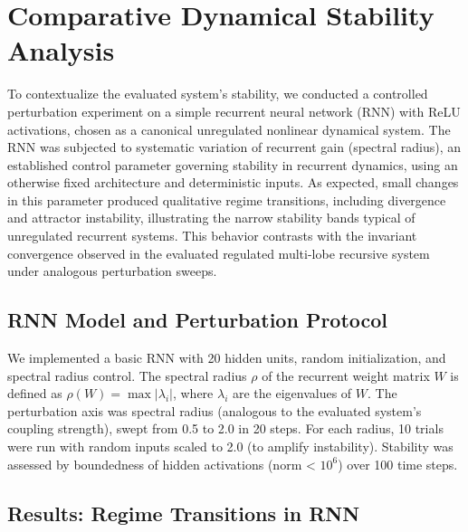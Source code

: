 \documentclass[11pt,a4paper]{article}
\begin{document}
\appendix

\section{Comparative Dynamical Stability Analysis}

To contextualize the evaluated system’s stability, we conducted a controlled perturbation experiment on a simple recurrent neural network (RNN) with ReLU activations, chosen as a canonical unregulated nonlinear dynamical system. The RNN was subjected to systematic variation of recurrent gain (spectral radius), an established control parameter governing stability in recurrent dynamics, using an otherwise fixed architecture and deterministic inputs. As expected, small changes in this parameter produced qualitative regime transitions, including divergence and attractor instability, illustrating the narrow stability bands typical of unregulated recurrent systems. This behavior contrasts with the invariant convergence observed in the evaluated regulated multi-lobe recursive system under analogous perturbation sweeps.

\subsection{RNN Model and Perturbation Protocol}

We implemented a basic RNN with 20 hidden units, random initialization, and spectral radius control. The spectral radius \(\rho\) of the recurrent weight matrix \(W\) is defined as \(\rho(W) = \max |\lambda_i|\), where \(\lambda_i\) are the eigenvalues of \(W\). The perturbation axis was spectral radius (analogous to the evaluated system's coupling strength), swept from 0.5 to 2.0 in 20 steps. For each radius, 10 trials were run with random inputs scaled to 2.0 (to amplify instability). Stability was assessed by boundedness of hidden activations (norm < \(10^6\)) over 100 time steps.

\subsection{Results: Regime Transitions in RNN}
\end{document}
